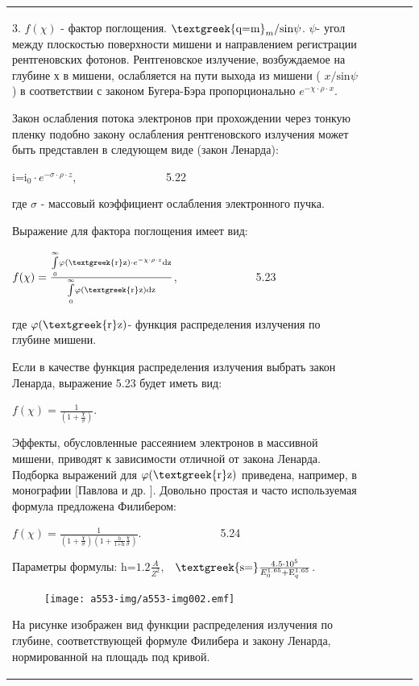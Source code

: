 \documentclass[a4paper,14pt, openany, twoside, draft]{extbook} %
\begin{document}
\begin{flushleft}
\begin{supertabular}{|m{1.7279999cm}|m{1.522cm}|m{1.522cm}|m{1.522cm}|m{1.744cm}|}
3.  $f(\chi )$ - фактор поглощения.   ${\text{\textgreek{q=m}}}_m\text{/sin}\psi $.  $\psi ${}- угол между плоскостью поверхности мишени и направлением регистрации рентгеновских фотонов. Рентгеновское излучение, возбуждаемое на глубине х в мишени, ослабляется на пути выхода из мишени ( $x\text{/sin}\psi $) в соответствии с законом Бугера-Бэра пропорционально  $e^{-\chi \cdot \rho \cdot x}$.

Закон ослабления потока электронов при прохождении через тонкую пленку подобно закону ослабления рентгеновского излучения может быть представлен в следующем виде (закон Ленарда):

 ${\text{i=i}}_0\cdot e^{-\sigma \cdot \rho \cdot z}$,\ \ \ \ \ \ \ \ \ \ \ \ \ \ \ \ 5.22

где ${\sigma}$ - массовый коэффициент ослабления электронного пучка.

Выражение для фактора поглощения имеет вид:

 $f(\chi )=\frac{\overset{\infty }{\underset 0{\int }}\varphi ({\text{\textgreek{r}z}})\cdot e^{-\chi \cdot \rho \cdot z}{\text{dz}}}{\overset{\infty }{\underset 0{\int }}\varphi ({\text{\textgreek{r}z}}){\text{dz}}}$,\ \ \ \ \ \ \ \ \ \ \ \ \ \ 5.23

где  $\varphi ({\text{\textgreek{r}z}})${}- функция распределения излучения по глубине мишени.

Если в качестве функция распределения излучения выбрать закон Ленарда, выражение 5.23 будет иметь вид:

 $f(\chi )=\frac 1{\left(1+\frac{\chi }{\sigma }\right)}$.

Эффекты, обусловленные рассеянием электронов в массивной мишени, приводят к зависимости отличной от закона Ленарда. Подборка выражений для  $\varphi ({\text{\textgreek{r}z}})$ приведена, например, в монографии [Павлова и др. ]. Довольно простая и часто используемая формула предложена Филибером:

 $f(\chi )=\frac 1{\left(1+\frac{\chi }{\sigma }\right)\left(1+\frac h{1{\text{+h}}}\frac{\chi }{\sigma }\right)}$.\ \ \ \ \ \ \ \ \ \ \ \ \ \ 5.24

Параметры формулы:  ${\text{h=}}1.2\frac A{Z^2}$,\ \  ${\text{\textgreek{s=}}}\frac{4.5\cdot 10^5}{E_0^{1.65}{\text{+E}}_q^{1.65}}$.



\begin{figure}
\centering
\texttt{[image: a553-img/a553-img002.emf]}
\end{figure}
На рисунке изображен вид функции распределения излучения по глубине, соответствующей формуле Филибера и закону Ленарда, нормированной на площадь под кривой.


\end{supertabular}
\end{flushleft}
\end{document}
